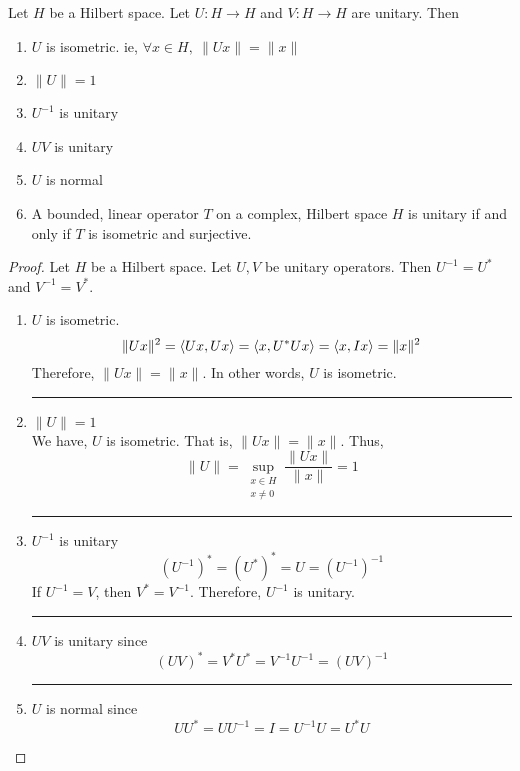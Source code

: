 \begin{theorem}
	Let $H$ be a Hilbert space.
	Let $U : H \to H$ and $V : H \to H$ are unitary.
	Then
	\begin{enumerate}
		\item $U$ is isometric. ie, $\forall x \in H,\ \|Ux\| = \|x\|$
		\item $\|U\| = 1$
		\item $U^{-1}$ is unitary
		\item $UV$ is unitary
		\item $U$ is normal
		\item A bounded, linear operator $T$ on a complex, Hilbert space $H$ is unitary if and only if $T$ is isometric and surjective.
	\end{enumerate}
\end{theorem}
\begin{proof}
	Let $H$ be a Hilbert space.
	Let $U,V$ be unitary operators.
	Then $U^{-1} = U^\ast$ and $V^{-1} = V^\ast$.
\begin{enumerate}
	\item $U$ is isometric.
		\[ \|Ux\|^2 = \left\langle Ux,Ux \right\rangle = \left\langle x,U^\ast Ux \right\rangle = \left\langle x,Ix \right\rangle = \|x\|^2  \]
		Therefore, $\|Ux\| = \|x\|$.
		In other words, $U$ is isometric.\\

	\hrule \vspace{1em}

	\item $\|U\| = 1$\\
		We have, $U$ is isometric.
		That is, $\|Ux\| = \|x\|$.
		Thus,
		\[ \|U\| = \sup_{\substack{x \in H\\ x \ne 0}} \frac{\|Ux\|}{\|x\|} = 1 \]

	\hrule \vspace{1em}

	\item $U^{-1}$ is unitary 
		\[ (U^{-1})^\ast = (U^\ast)^\ast = U = (U^{-1})^{-1} \]
		If $U^{-1} = V$, then $V^\ast = V^{-1}$.
		Therefore, $U^{-1}$ is unitary.\\

	\hrule \vspace{1em}

	\item $UV$ is unitary since
		\[ (UV)^\ast = V^\ast U^\ast = V^{-1} U^{-1} = (UV)^{-1} \]

	\hrule \vspace{1em}

	\item $U$ is normal since
		\[ UU^\ast = UU^{-1} = I = U^{-1}U = U^\ast U \]


\end{enumerate}
\end{proof}

